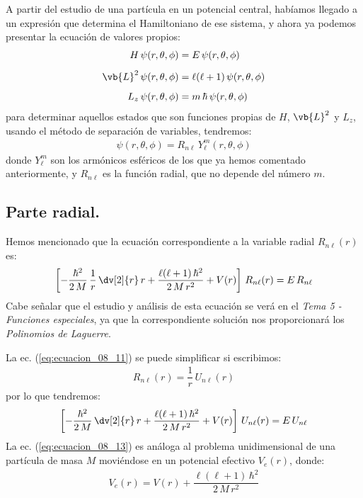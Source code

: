 A partir del estudio de una partícula en un potencial central, habíamos llegado a un expresión que determina el Hamiltoniano de ese sistema, y ahora ya podemos presentar la ecuación de valores propios:
\begin{align}
H \, \psi(r, \theta, \phi) &= E \, \psi(r, \theta, \phi) \label{eq:ecuacion_08_05} \\[0.5em]
\vb{L}^{2} \, \psi(r, \theta, \phi) &= \ell(\ell +  1) \, \psi(r, \theta, \phi) \label{eq:ecuacion_08_06} \\[0.5em]
L_{z} \, \psi(r, \theta, \phi) &= m \, \hbar \, \psi(r, \theta, \phi) \label{eq:ecuacion_08_07}
\end{align}
para determinar aquellos estados que son funciones propias de $H$, $\vb{L}^{2}$ y $L_{z}$, usando el método de separación de variables, tendremos:
\begin{align}
\psi(r, \theta, \phi) = R_{n \ell} \, Y_{\ell}^{m} (r, \theta, \phi)
\label{eq:ecuacion_08_08}
\end{align}
donde $Y_{\ell}^{m}$ son los armónicos esféricos de los que ya hemos comentado anteriormente, y $R_{n \ell}$ es la función radial, que no depende del número $m$.
\subsection{Parte radial.}
Hemos mencionado que la ecuación correspondiente a la variable radial $R_{n \ell}(r)$ es:
\begin{align}
\left[ - \dfrac{\hbar^{2}}{2 \, M} \, \dfrac{1}{r} \, \dv[2]{r} \, r + \dfrac{\ell (\ell + 1) \, \hbar^{2}}{2 \, M \, r^{2}} + V(r) \right] \, R_{n \ell} (r) = E \, R_{n \ell}
\label{eq:ecuacion_08_11}
\end{align}
Cabe señalar que el estudio y análisis de esta ecuación se verá en el \emph{Tema 5 - Funciones especiales}, ya que la correspondiente solución nos proporcionará los \emph{Polinomios de Laguerre}.
\par
La ec. (\ref{eq:ecuacion_08_11}) se puede simplificar si escribimos:
\begin{align}
R_{n \ell} (r) = \dfrac{1}{r} \, U_{n \ell} (r)
\label{eq:ecuacion_08_12}
\end{align}
por lo que tendremos:
\begin{align}
\left[ - \dfrac{\hbar^{2}}{2 \, M} \, \dv[2]{r} \, r + \dfrac{\ell (\ell + 1) \, \hbar^{2}}{2 \, M \, r^{2}} + V(r) \right] \, U_{n \ell} (r) = E \, U_{n \ell}
\label{eq:ecuacion_08_13}
\end{align}
La ec. (\ref{eq:ecuacion_08_13}) es análoga al problema unidimensional de una partícula de masa $M$ moviéndose en un potencial efectivo $V_{e}(r)$, donde:
\begin{align}
V_{e} (r) = V (r) + \dfrac{\ell (\ell + 1) \, \hbar^{2}}{2 \, M \, r^{2}}
\label{eq:ecuacion_08_14}
\end{align}
